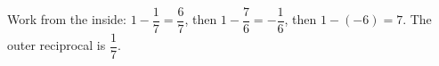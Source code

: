 Work from the inside: $1-\dfrac{1}{7}=\dfrac{6}{7}$, then $1-\dfrac{7}{6}=-\dfrac{1}{6}$, then $1-(-6)=7$. The outer reciprocal is $\boxed{\dfrac{1}{7}}$.
